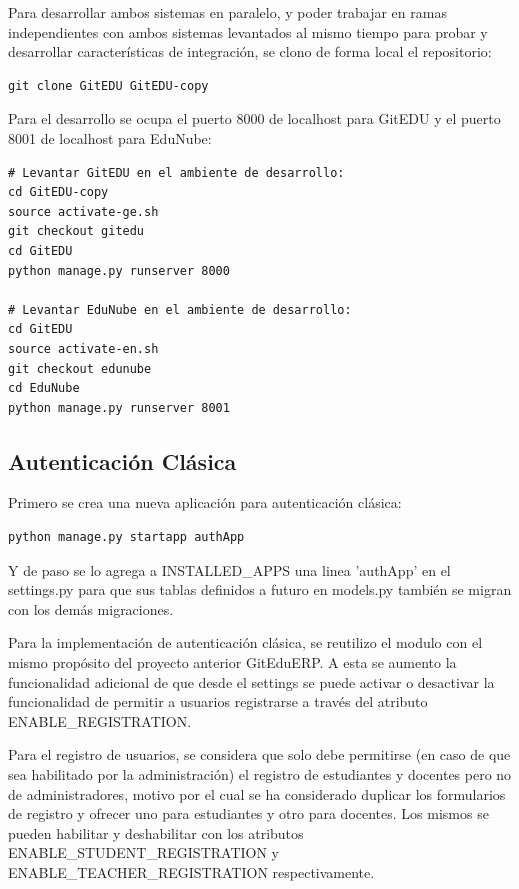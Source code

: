 Para desarrollar ambos sistemas en paralelo, y poder trabajar en ramas independientes con ambos sistemas levantados al mismo tiempo para probar y desarrollar características de integración, se clono de forma local el repositorio:
\begin{lstlisting}
git clone GitEDU GitEDU-copy
\end{lstlisting}

Para el desarrollo se ocupa el puerto 8000 de localhost para GitEDU y el puerto 8001 de localhost para EduNube:
\begin{lstlisting}
# Levantar GitEDU en el ambiente de desarrollo:
cd GitEDU-copy
source activate-ge.sh
git checkout gitedu
cd GitEDU
python manage.py runserver 8000

# Levantar EduNube en el ambiente de desarrollo:
cd GitEDU
source activate-en.sh
git checkout edunube
cd EduNube
python manage.py runserver 8001
\end{lstlisting}

\subsection{Autenticación Clásica}

Primero se crea una nueva aplicación para autenticación clásica:
\begin{lstlisting}
python manage.py startapp authApp
\end{lstlisting}

Y de paso se lo agrega a INSTALLED\_APPS una linea 'authApp' en el settings.py para que sus tablas definidos a futuro en models.py también se migran con los demás migraciones.

Para la implementación de autenticación clásica, se reutilizo el modulo con el mismo propósito del proyecto anterior GitEduERP. A esta se aumento la funcionalidad adicional de que desde el settings se puede activar o desactivar la funcionalidad de permitir a usuarios registrarse a través del atributo ENABLE\_REGISTRATION. 

Para el registro de usuarios, se considera que solo debe permitirse (en caso de que sea habilitado por la administración) el registro de estudiantes y docentes pero no de administradores, motivo por el cual se ha considerado duplicar los formularios de registro y ofrecer uno para estudiantes y otro para docentes. Los mismos se pueden habilitar y deshabilitar con los atributos ENABLE\_STUDENT\_REGISTRATION y ENABLE\_TEACHER\_REGISTRATION respectivamente.

